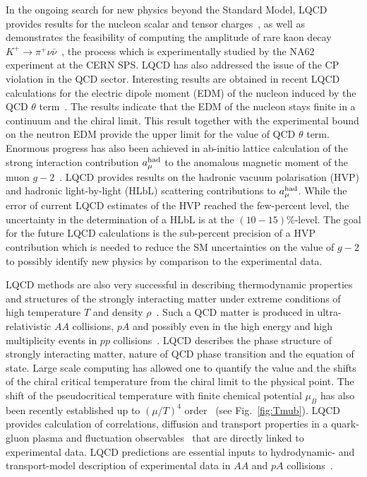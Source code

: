 In the  ongoing search for new physics beyond the Standard Model,  LQCD   provides results  for  the  nucleon  scalar and tensor charges~\cite{Aoki,Alexandrou:2017qyt}, as well as demonstrates   the feasibility of  computing the amplitude of rare kaon decay $K^+\to \pi^+ \nu\bar\nu$~\cite{Bai:2018hqu}, the process   which is experimentally  studied  by   the NA62 experiment at the CERN SPS. LQCD has also addressed the issue of the  CP violation in the QCD sector.   Interesting results are obtained  in recent LQCD calculations  for  the  electric dipole moment (EDM)  of the nucleon induced by the QCD $\theta$ term~\cite{Dragos:2019oxn}. The  results  indicate  that the EDM of the nucleon stays finite in  a continuum and the chiral limit.  This result together with the experimental bound on    the neutron EDM provide the  upper limit     for  the value of QCD $\theta$ term.   
Enormous progress has also been achieved in ab-initio  lattice  calculation of  the strong interaction contribution $a_\mu^{\rm had}$  to the anomalous magnetic moment of the muon $g-2$~\cite{Meyer:2018til,Westin:2019tgc}.  LQCD
provides  results on   the   hadronic  vacuum polarisation (HVP) and hadronic light-by-light (HLbL) scattering contributions to $a_\mu^{\rm had}$. While the  error of current LQCD estimates of the HVP reached  the few-percent level, the 
 uncertainty in the  determination of a HLbL is  at the $(10-15)\%$-level. The goal for the future LQCD calculations is  the sub-percent precision  of a HVP contribution  which is needed to reduce the SM uncertainties  on the value of  $g-2$ to possibly  identify  new physics  by   comparison to the  experimental data.

LQCD methods are also very successful  in describing  thermodynamic   properties
and structures of the strongly interacting matter under extreme conditions of high temperature $T$  and  density $\rho$~\cite{Bazavov:2019lgz,Andronic:2017pug,Soltz:2015ula,Ding:2015ona,Ratti:2018ksb}.  Such a QCD matter  is produced in ultra-relativistic $AA$ collisions, $pA$ and possibly  even   in the high energy and high multiplicity events in $pp$ collisions~\cite{Citron:2018lsq}.  LQCD   describes   the phase structure of  strongly interacting matter,   nature of QCD  phase transition and the equation of state. Large scale computing has allowed one to quantify  the value and the shifts of the chiral critical temperature from the  chiral limit  to the physical point. The shift of the pseudocritical temperature with finite chemical potential  $\mu_B$ has also been  recently established up to $(\mu/T)^4$ order~\cite{Bazavov:2018mes}  (see Fig.~\ref{fig:Tmub}). LQCD provides  calculation of  correlations, diffusion and transport properties  in  a quark-gluon plasma and  fluctuation observables~\cite{Soltz:2015ula,Friman:2011pf,Karsch:2010ck}  that are directly linked to experimental data. LQCD predictions are essential  inputs to hydrodynamic-   and transport-model description of experimental data   in $AA$ and  $pA$   collisions~\cite{Citron:2018lsq}.


